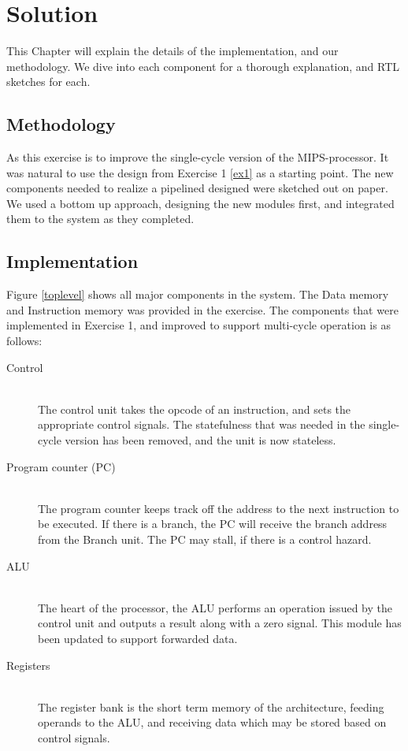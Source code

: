 \chapter{Solution}
This Chapter will explain the details of the implementation, and our methodology. We dive into each component for a thorough explanation, and RTL sketches for each.


\section{Methodology}
As this exercise is to improve the single-cycle version of the MIPS-processor. It was natural to use the design from Exercise 1 \ref{ex1} as a starting point.
The new components needed to realize a pipelined designed were sketched out on paper. We used a bottom up approach, designing the new modules first, and integrated them to the system as they completed.

\section{Implementation}
Figure \ref{toplevel} shows all major components in the system. 
The Data memory and Instruction memory was provided in the exercise.
The components that were implemented in Exercise 1, and improved to support multi-cycle operation is as follows:

\begin{description}
  \item[Control] \hfill \\
  The control unit takes the opcode of an instruction, and sets the appropriate control signals. The statefulness that was needed in the single-cycle version has been removed, and the unit is now stateless.  
  \item[Program counter (PC)] \hfill \\
  The program counter keeps track off the address to the next instruction to be executed. If there is a branch, the PC will receive the branch address from the Branch unit. The PC may stall, if there is a control hazard.
  \item[ALU] \hfill \\
  The heart of the processor, the ALU performs an operation issued by the control unit and outputs a result along with a zero signal. This module has been updated to support forwarded data.
  \item[Registers] \hfill \\
  The register bank is the short term memory of the architecture, feeding operands to the ALU, and receiving data which may be stored based on control signals.
\end{description}

